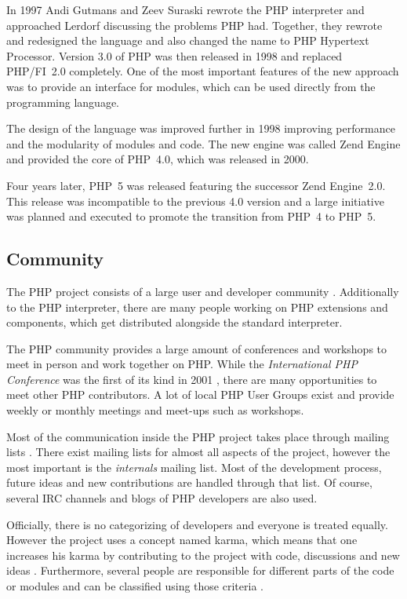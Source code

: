 In 1997 Andi Gutmans and Zeev Suraski rewrote the PHP interpreter and
approached Lerdorf discussing the problems PHP had. Together, they rewrote and
redesigned the language and also changed the name to PHP Hypertext Processor.
Version 3.0 of PHP was then released in 1998 and replaced PHP/FI~2.0
completely. One of the most important features of the new approach was to
provide an interface for modules, which can be used directly from the
programming language.

The design of the language was improved further in 1998 improving performance
and the modularity of modules and code. The new engine was called Zend Engine
and provided the core of PHP~4.0, which was released in 2000.

Four years later, PHP~5 was released featuring the successor Zend Engine~2.0.
This release was incompatible to the previous 4.0 version and a large
initiative was planned and executed to promote the transition from PHP~4 to
PHP~5.


\subsection{Community} %

The PHP project consists of a large user and developer community
\cite{Magnusson2010}. Additionally to the PHP interpreter, there are many
people working on PHP extensions and components, which get distributed
alongside the standard interpreter.

The PHP community provides a large amount of conferences and workshops to meet
in person and work together on PHP. While the \emph{International PHP
Conference} was the first of its kind in 2001 \cite{PHPConferences}, there are
many opportunities to meet other PHP contributors. A lot of local PHP User
Groups exist and provide weekly or monthly meetings and meet-ups such as
workshops.

Most of the communication inside the PHP project takes place through mailing
lists \cite{Magnusson2010}. There exist mailing lists for almost all aspects of
the project, however the most important is the \emph{internals} mailing list.
Most of the development process, future ideas and new contributions are handled
through that list. Of course, several \ac{IRC} channels and blogs of PHP
developers are also used.

Officially, there is no categorizing of developers and everyone is treated
equally. However the project uses a concept named karma, which means
that one increases his karma by contributing to the project with code,
discussions and new ideas \cite{Magnusson2010}. Furthermore, several people are
responsible for different parts of the code or modules and can be classified
using those criteria \cite{PHPCredits}.

